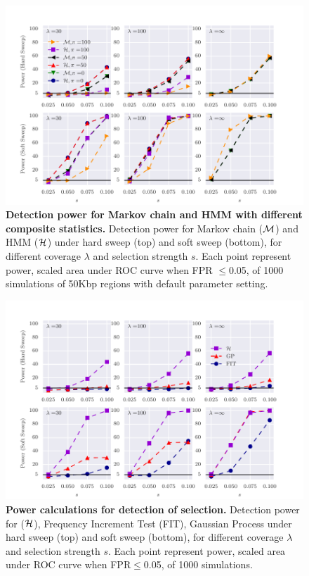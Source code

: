 \documentclass[11pt]{article}
\def\comale{\text{{\sc Comale}}}
\begin{document}
\begin{figure}[H]
	\centering
	\includegraphics[width=\textwidth]{figures/powerCLR.pdf}
	\caption{{\bf Detection power for Markov chain and HMM with different 
	composite statistics.} 
Detection power for Markov chain (${\cal M}$) and HMM (${\cal H}$) under hard sweep (top)
and soft sweep (bottom), for different coverage $\lambda$ and selection 
strength $s$.
Each point represent power, scaled area under ROC curve when FPR $\le$0.05, of 
1000 
simulations of 50Kbp regions with default parameter setting.
} \label{fig:powerCLR}
\end{figure}

\begin{figure}[H]
	\centering
	\includegraphics[width=\textwidth]{figures/power.pdf}
	\caption{ {\bf Power calculations for detection of selection.}
		Detection power for \comale (${\cal H}$), Frequency Increment Test
		(FIT), Gaussian Process under hard 
		sweep (top)
		and soft sweep (bottom), for different coverage $\lambda$ and selection 
		strength $s$.
		Each point represent power, scaled area under ROC curve when 
		FPR$\le$0.05, 
		of 1000 simulations.} \label{fig:power}
\end{figure}
\end{document}
